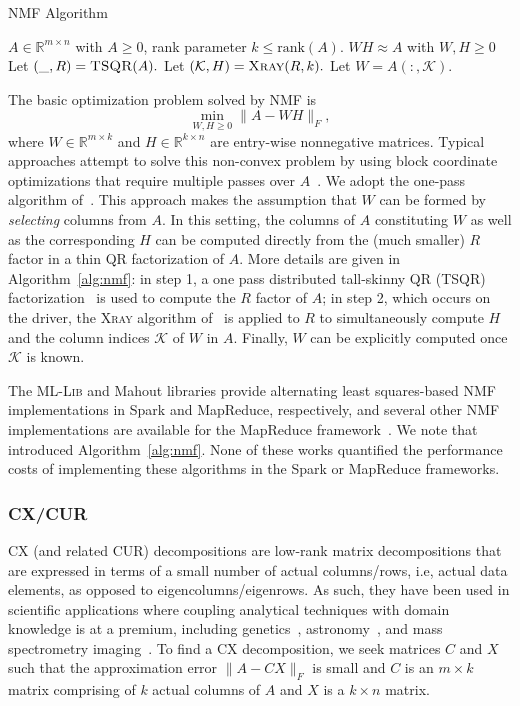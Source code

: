\begin{algorithm}[tb]
    \caption{\textsc{NMF} Algorithm}
    \label{alg:nmf}
    \begin{algorithmic}[1]
      \Require $A \in \mathbb{R}^{m\times n}$ with $A \geq 0$, rank parameter $k \leq \textrm{rank}(A).$
      \Ensure $W H \approx A$ with $W,H \geq 0$
      \State Let $(\_, R) = \textsc{TSQR}(A).$
      \State Let $(\mathcal{K}, H) = \textsc{Xray}(R, k).$
      \State Let $W = A(:, \mathcal{K}).$
    \end{algorithmic}
  \end{algorithm}
  
The basic optimization problem solved by NMF is
\begin{equation}
\min_{W,H \geq 0} \|A - WH\|_F,
\end{equation}
where $W \in \mathbb{R}^{m \times k}$ and $H \in \mathbb{R}^{k \times n}$ are entry-wise nonnegative matrices. Typical approaches attempt to solve this non-convex problem by using block coordinate optimizations that require multiple passes over $A$~\cite{kim2014algorithms}. We adopt the one-pass algorithm of~\cite{benson2014scalable}. This approach makes the assumption that $W$ can be formed by {\it selecting} columns from $A$. In this setting, the columns of $A$ constituting $W$ as well as the corresponding $H$ can be computed directly from the (much smaller) $R$ factor in a thin QR factorization of $A$. More details are given in Algorithm~\ref{alg:nmf}: in step 1, a one pass distributed tall-skinny QR (\textsc{TSQR}) factorization~\cite{demmel2012communication} is used to compute the $R$ factor of $A$; in step 2, which occurs on the driver, the \textsc{Xray} algorithm of~\cite{kumar2013fast} is applied to $R$ to simultaneously compute $H$ and the column indices $\mathcal{K}$ of $W$ in $A$. Finally, $W$ can be explicitly computed once $\mathcal{K}$ is known.

The \textsc{ML-Lib} and Mahout libraries provide alternating least squares-based NMF implementations in Spark and MapReduce, respectively, and several other NMF implementations are available for the MapReduce framework~\cite{liu2010distributed,Liao201448,benson2014scalable}. We note that~\cite{benson2014scalable} introduced Algorithm~\ref{alg:nmf}. None of these works quantified the performance costs of implementing these algorithms in the Spark or MapReduce frameworks.

\subsubsection{CX/CUR}
CX (and related CUR) decompositions are
low-rank matrix decompositions that are expressed in terms of a small number of actual columns/rows, i.e, actual data elements, as opposed to eigencolumns/eigenrows.  
As such, they have been used in scientific applications where coupling analytical techniques with domain knowledge is at a premium, including
genetics~\cite{Paschou07b}, astronomy~\cite{Yip14-AJ}, and mass spectrometry imaging~\cite{YRPMB15}. To find a CX decomposition, we seek matrices $C$ and $X$ such that the approximation error $\|A-CX\|_F$ is small and $C$ is an $m\times k$ matrix comprising of $k$
actual columns of $A$ and $X$ is a $k \times n$ matrix.

